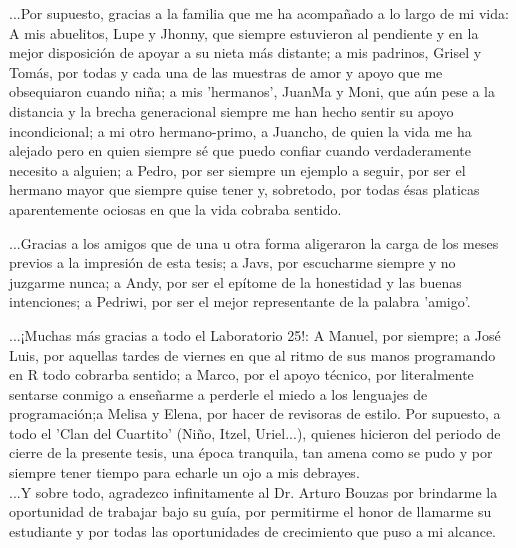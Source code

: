 \documentclass[
11pt, %
spanish, %
singlespacing, %
headsepline, %
]{MastersDoctoralThesis} %
\begin{document}
\begin{acknowledgements}
...Por supuesto, gracias a la familia que me ha acompañado a lo largo de mi vida: A mis abuelitos, Lupe y Jhonny, que siempre estuvieron al pendiente y en la mejor disposición de apoyar a su nieta más distante; a mis padrinos, Grisel y Tomás, por todas y cada una de las muestras de amor y apoyo que me obsequiaron cuando niña; a mis 'hermanos', JuanMa y Moni, que aún pese a la distancia y la brecha generacional siempre me han hecho sentir su apoyo incondicional; a mi otro hermano-primo, a Juancho, de quien la vida me ha alejado pero en quien siempre sé que puedo confiar cuando verdaderamente necesito a alguien; a Pedro, por ser siempre un ejemplo a seguir, por ser el hermano mayor que siempre quise tener y, sobretodo, por todas ésas platicas aparentemente ociosas en que la vida cobraba sentido. 

...Gracias a los amigos que de una u otra forma aligeraron la carga de los meses previos a la impresión de esta tesis; a Javs, por escucharme siempre y no juzgarme nunca; a Andy, por ser el epítome de la honestidad y las buenas intenciones; a Pedriwi, por ser el mejor representante de la palabra 'amigo'.

...¡Muchas más gracias a todo el Laboratorio 25!: A Manuel, por siempre; a José Luis, por aquellas tardes de viernes en que al ritmo de sus manos programando en R todo cobrarba sentido; a Marco, por el apoyo técnico, por literalmente sentarse conmigo a enseñarme a perderle el miedo a los lenguajes de programación;a Melisa y Elena, por  hacer de revisoras de estilo. Por supuesto, a todo el 'Clan del Cuartito' (Niño, Itzel, Uriel...), quienes hicieron del periodo de cierre de la presente tesis, una época tranquila, tan amena como se pudo y por siempre tener tiempo para echarle un ojo a mis debrayes.\\

...Y sobre todo, agradezco infinitamente al Dr. Arturo Bouzas por brindarme la oportunidad de trabajar bajo su guía, por permitirme el honor de llamarme su estudiante y por todas las oportunidades de crecimiento que puso a mi alcance.

\end{acknowledgements}


\tableofcontents %
\end{document}
